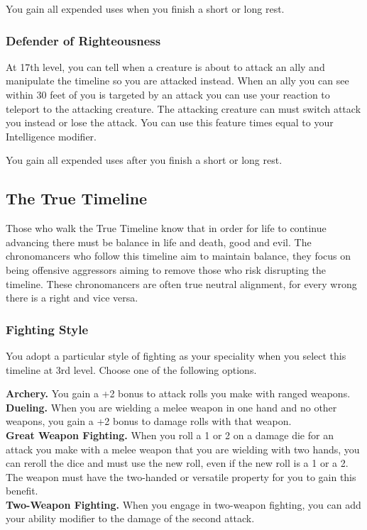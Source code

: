 You gain all expended uses when you finish a short or long rest.

\subsubsection{Defender of Righteousness}

At 17th level, you can tell when a creature is about to attack an ally and manipulate the timeline so you are attacked instead. When an ally you can see within 30 feet of you is targeted by an attack you can use your reaction to teleport to the attacking creature. The attacking creature can must switch attack you instead or lose the attack. You can use this feature times equal to your Intelligence modifier.

You gain all expended uses after you finish a short or long rest.

\subsection{The True Timeline}

Those who walk the True Timeline know that in order for life to continue advancing there must be balance in life and death, good and evil. The chronomancers who follow this timeline aim to maintain balance, they focus on being offensive aggressors aiming to remove those who risk disrupting the timeline. These chronomancers are often true neutral alignment, for every wrong there is a right and vice versa.

\subsubsection{Fighting Style}

You adopt a particular style of fighting as your speciality when you select this timeline at 3rd level. Choose one of the following options.

\textbf{Archery.} You gain a +2 bonus to attack rolls you make with ranged weapons.\\
\textbf{Dueling.} When you are wielding a melee weapon in one hand and no other weapons, you gain a +2 bonus to damage rolls with that weapon.\\
\textbf{Great Weapon Fighting.} When you roll a 1 or 2 on a damage die for an attack you make with a melee weapon that you are wielding with two hands, you can reroll the dice and must use the new roll, even if the new roll is a 1 or a 2. The weapon must have the two-handed or versatile property for you to gain this benefit.\\
\textbf{Two-Weapon Fighting.} When you engage in two-weapon fighting, you can add your ability modifier to the damage of the second attack.\\

